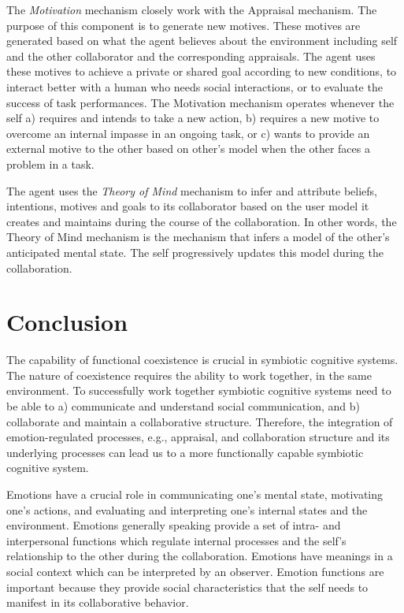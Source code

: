 \documentclass[letterpaper]{article}
\begin{document}
The \textit{Motivation} mechanism closely work with the Appraisal mechanism. The
purpose of this component is to generate new motives. These motives are
generated based on what the agent believes about the environment including self
and the other collaborator and the corresponding appraisals. The agent uses
these motives to achieve a private or shared goal according to new conditions,
to interact better with a human who needs social interactions, or to evaluate
the success of task performances. The Motivation mechanism operates whenever the
self a) requires and intends to take a new action, b) requires a new motive to
overcome an internal impasse in an ongoing task, or c) wants to provide an
external motive to the other based on other's model when the other faces a
problem in a task.

The agent uses the \textit{Theory of Mind} mechanism to infer and attribute
beliefs, intentions, motives and goals to its collaborator based on the user
model it creates and maintains during the course of the collaboration. In
other words, the Theory of Mind mechanism is the mechanism that infers a model
of the other's anticipated mental state. The self progressively updates this
model during the collaboration.

\section{Conclusion}

The capability of functional coexistence is crucial in symbiotic cognitive
systems. The nature of coexistence requires the ability to work together, in the
same environment. To successfully work together symbiotic cognitive systems need
to be able to a) communicate and understand social communication, and b)
collaborate and maintain a collaborative structure. Therefore, the integration
of emotion-regulated processes, e.g., appraisal, and collaboration structure and
its underlying processes can lead us to a more functionally capable symbiotic
cognitive system.

Emotions have a crucial role in communicating one's mental state, motivating
one's actions, and evaluating and interpreting one's internal states and the
environment. Emotions generally speaking provide a set of intra- and
interpersonal functions which regulate internal processes and the self's
relationship to the other during the collaboration.
Emotions have meanings in a social context which can be interpreted by an
observer. Emotion functions are important because they provide social
characteristics that the self needs to manifest in its collaborative behavior. 
\end{document}

